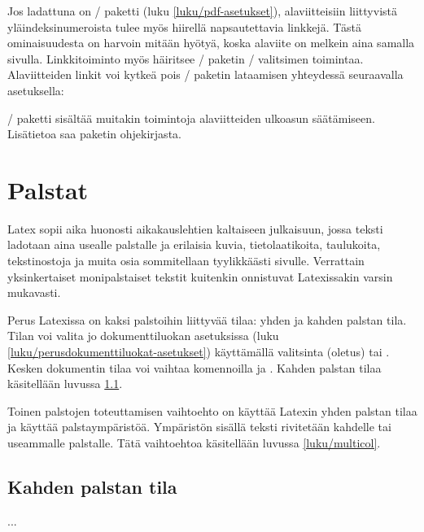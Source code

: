 Jos ladattuna on \-/ paketti (luku
\ref{luku/pdf-asetukset}), alaviitteisiin liittyvistä
yläindeksinumeroista tulee myös hiirellä napsautettavia linkkejä. Tästä
ominaisuudesta on harvoin mitään hyötyä, koska alaviite on melkein aina
samalla sivulla. Linkkitoiminto myös häiritsee \-/
paketin \-/ valitsimen toimintaa. Alaviitteiden linkit
voi kytkeä pois \-/ paketin lataamisen yhteydessä
seuraavalla asetuksella:

\begin{koodilohkosis}
\usepackage[hyperfootnotes=false]{hyperref}
\end{koodilohkosis}

\-/ paketti sisältää muitakin toimintoja alaviitteiden
ulkoasun säätämiseen. Lisätietoa saa paketin ohjekirjasta.

\section{Palstat}
\label{luku/palstat}

Latex sopii aika huonosti aikakauslehtien kaltaiseen julkaisuun, jossa
teksti ladotaan aina usealle palstalle ja erilaisia kuvia,
tietolaatikoita, taulukoita, tekstinostoja ja muita osia sommitellaan
tyylikkäästi sivulle. Verrattain yksinkertaiset monipalstaiset tekstit
kuitenkin onnistuvat Latexissakin varsin mukavasti.

Perus Latexissa on kaksi palstoihin liittyvää tilaa: yhden ja kahden
palstan tila. Tilan voi valita jo dokumenttiluokan asetuksissa (luku
\ref{luku/perusdokumenttiluokat-asetukset}) käyttämällä valitsinta
 (oletus) tai . Kesken dokumentin
tilaa voi vaihtaa komennoilla  ja
. Kahden palstan tilaa käsitellään luvussa
\ref{luku/kahden-palstan-tila}.

Toinen palstojen toteuttamisen vaihtoehto on käyttää Latexin yhden
palstan tilaa ja käyttää palstaympäristöä. Ympäristön sisällä teksti
rivitetään kahdelle tai useammalle palstalle. Tätä vaihtoehtoa
käsitellään luvussa \ref{luku/multicol}.

\subsection{Kahden palstan tila}
\label{luku/kahden-palstan-tila}

...

